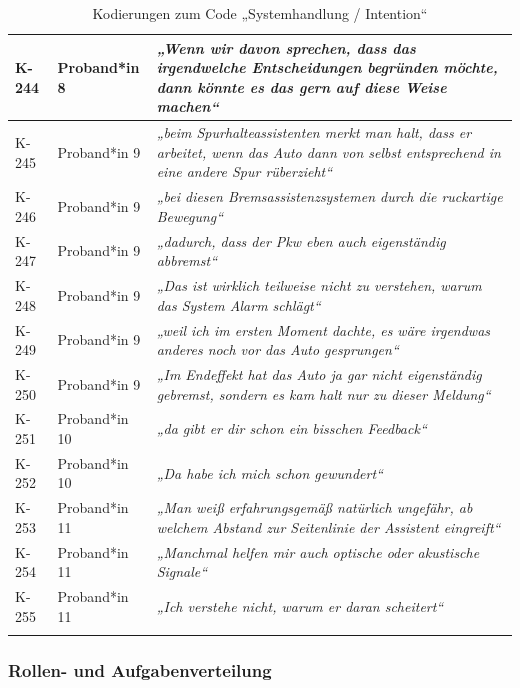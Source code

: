 {\begin{xltabular}{\textwidth}{
    |P{0.10\textwidth}
    |P{0.17\textwidth}
    |Y|
}
\hline
K-244 & Proband*in 8 & \textit{„Wenn wir davon sprechen, dass das irgendwelche Entscheidungen begründen möchte, dann könnte es das gern auf diese Weise machen“} \\
\hline
K-245 & Proband*in 9 & \textit{„beim Spurhalteassistenten merkt man halt, dass er arbeitet, wenn das Auto dann von selbst entsprechend in eine andere Spur rüberzieht“} \\
\hline
K-246 & Proband*in 9 & \textit{„bei diesen Bremsassistenzsystemen durch die ruckartige Bewegung“} \\
\hline
K-247 & Proband*in 9 & \textit{„dadurch, dass der Pkw eben auch eigenständig abbremst“} \\
\hline
K-248 & Proband*in 9 & \textit{„Das ist wirklich teilweise nicht zu verstehen, warum das System Alarm schlägt“} \\
\hline
K-249 & Proband*in 9 & \textit{„weil ich im ersten Moment dachte, es wäre irgendwas anderes noch vor das Auto gesprungen“} \\
\hline
K-250 & Proband*in 9 & \textit{„Im Endeffekt hat das Auto ja gar nicht eigenständig gebremst, sondern es kam halt nur zu dieser Meldung“} \\
\hline
K-251 & Proband*in 10 & \textit{„da gibt er dir schon ein bisschen Feedback“} \\
\hline
K-252 & Proband*in 10 & \textit{„Da habe ich mich schon gewundert“} \\
\hline
K-253 & Proband*in 11 & \textit{„Man weiß erfahrungsgemäß natürlich ungefähr, ab welchem Abstand zur Seitenlinie der Assistent eingreift“} \\
\hline
K-254 & Proband*in 11 & \textit{„Manchmal helfen mir auch optische oder akustische Signale“} \\
\hline
K-255 & Proband*in 11 & \textit{„Ich verstehe nicht, warum er daran scheitert“} \\
\hline
\caption{Kodierungen zum Code „Systemhandlung / Intention“}\label{tab:kodiernachweis-systemhandlung-intention}\\
\end{xltabular}
}

\clearpage
\subsubsection{Rollen- und Aufgabenverteilung}

